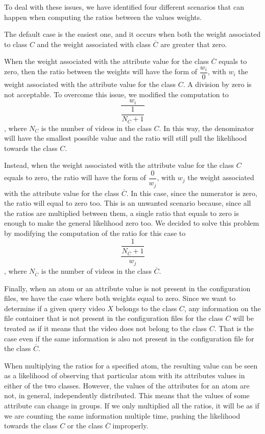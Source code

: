 To deal with these issues, we have identified four different scenarios that can happen when computing the ratios between the values weights.

The default case is the easiest one, and it occurs when both the weight associated to class $C$ and the weight associated with class $\overline{C}$ are greater that zero.

When the weight associated with the attribute value for the class $\overline{C}$ equals to zero, then the ratio between the weights will have the form of $ \dfrac{w_{i}}{0} $, with $w_{i}$ the weight associated with the attribute value for the class $C$. A division by zero is not acceptable. To overcome this issue, we modified the computation to $$ \dfrac{w_{i}}{\dfrac{1}{N_{C} + 1}} $$, where $N_{C}$ is the number of videos in the class $C$. In this way, the denominator will have the smallest possible value and the ratio will still pull the likelihood towards the class $C$.

Instead, when the weight associated with the attribute value for the class $C$ equals to zero, the ratio will have the form of $ \dfrac{0}{w_{j}} $, with $w_{j}$ the weight associated with the attribute value for the class $\overline{C}$. In this case, since the numerator is zero, the ratio will equal to zero too. This is an unwanted scenario because, since all the ratios are multiplied between them, a single ratio that equals to zero is enough to make the general likelihood zero too. We decided to solve this problem by modifying the computation of the ratio for this case to $$ \dfrac{\dfrac{1}{N_{\overline{C}} + 1}}{w_{j}} $$, where $N_{\overline{C}}$ is the number of videos in the class $\overline{C}$.

Finally, when an atom or an attribute value is not present in the configuration files, we have the case where both weights equal to zero. Since we want to determine if a given query video $X$ belongs to the class $C$, any information on the file container that is not present in the configuration files for the class $C$ will be treated as if it means that the video does not belong to the class $C$. That is the case even if the same information is also not present in the configuration file for the class $\overline{C}$.

When multiplying the ratios for a specified atom, the resulting value can be seen as a likelihood of observing that particular atom with its attributes values in either of the two classes. However, the values of the attributes for an atom are not, in general, independently distributed. This means that the values of some attribute can change in groups. If we only multiplied all the ratios, it will be as if we are counting the same information multiple time, pushing the likelihood towards the class $C$ or the class $\overline{C}$ improperly.

